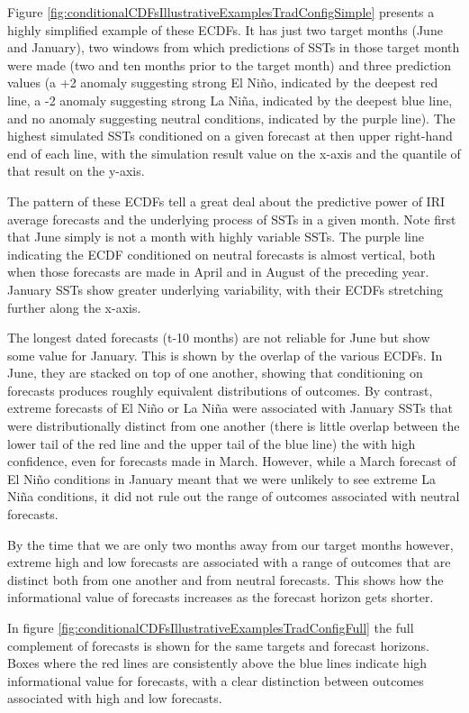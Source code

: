 \documentclass[authoryear]{article}
\begin{document}
Figure \ref{fig:conditionalCDFsIllustrativeExamplesTradConfigSimple} presents a highly simplified example of these ECDFs. It has just two target months (June and January), two windows from which predictions of SSTs in those target month were made (two and ten months prior to the target month) and three prediction values (a +2 anomaly suggesting strong El Ni\~no, indicated by the deepest red line, a -2 anomaly suggesting strong La Ni\~na, indicated by the deepest blue line, and no anomaly suggesting neutral conditions, indicated by the purple line). The highest simulated SSTs conditioned on a given forecast at then upper right-hand end of each line, with the simulation result value on the x-axis and the quantile of that result on the y-axis.

The pattern of these ECDFs tell a great deal about the predictive power of IRI average forecasts and the underlying process of SSTs in a given month. Note first that June simply is not a month with highly variable SSTs. The purple line indicating the ECDF conditioned on neutral forecasts is almost vertical, both when those forecasts are made in April and in  August of the preceding year. January SSTs show greater underlying variability, with their ECDFs stretching further along the x-axis.

The longest dated forecasts (t-10 months) are not reliable for June but show some value for January. This is shown by the overlap of the various ECDFs. In June, they are stacked on top of one another, showing that conditioning on forecasts produces roughly equivalent distributions of outcomes. By contrast, extreme forecasts of El Ni\~no or La Ni\~na were associated with January SSTs that were distributionally distinct from one another (there is little overlap between the lower tail of the red line and the upper tail of the blue line) the with high confidence, even for forecasts made in March. However, while a March forecast of El Ni\~no conditions in January meant that we were unlikely to see extreme La Ni\~na conditions, it did not rule out the range of outcomes associated with neutral forecasts.

By the time that we are only two months away from our target months however, extreme high and low forecasts are associated with a range of outcomes that are distinct both from one another and from neutral forecasts. This shows how the informational value of forecasts increases as the forecast horizon gets shorter.

In figure \ref{fig:conditionalCDFsIllustrativeExamplesTradConfigFull} the full complement of forecasts is shown for the same targets and forecast horizons. Boxes where the red lines are consistently above the blue lines indicate high informational value for forecasts, with a clear distinction between outcomes associated with high and low forecasts.
\end{document}
